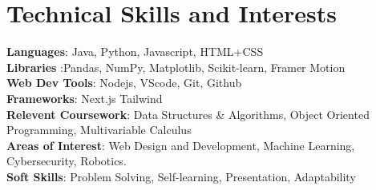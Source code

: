 \documentclass[a4paper,11pt]{article}
\makeatletter
\newcommand{\resumePOR}[3]{
\vspace{0.5mm}\item
    \begin{tabular*}{0.97\textwidth}[t]{l@{\extracolsep{\fill}}r}
        \textbf{#1}\hspace{0.3mm}#2 & \textit{\small{#3}} 
    \end{tabular*}
    \vspace{-2mm}
}
\newcommand{\resumeSubHeadingListStart}{\begin{itemize}[leftmargin=*,labelsep=0mm]}
\newcommand{\resumeSubHeadingListEnd}{\end{itemize}\vspace{2mm}}
\makeatother
\begin{document}
\section{\textbf{Technical Skills and Interests}}
 \begin{itemize}[leftmargin=0.05in, label={}]
    \small{\item{
     \textbf{Languages}{: Java, Python, Javascript, HTML+CSS } \\
     \textbf{Libraries }{:Pandas, NumPy, Matplotlib, Scikit-learn, Framer Motion }\\ 
     \textbf{Web Dev Tools}{: Nodejs, VScode, Git, Github } \\ 
     \textbf{Frameworks}{: Next.js Tailwind } \\  
      \textbf{Relevent Coursework}{: Data Structures \& Algorithms, Object Oriented Programming, Multivariable Calculus } \\ 
     \textbf{Areas of Interest}{: Web Design and Development, Machine Learning, Cybersecurity, Robotics.} \\
     \textbf{Soft Skills}{: Problem Solving, Self-learning, Presentation, Adaptability} \\
    }}
 \end{itemize}
 \vspace{-16pt}




    



\end{document}
